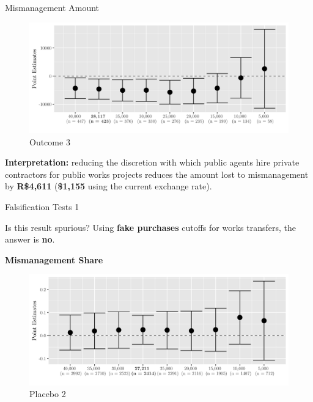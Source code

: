 \documentclass[10pt,ignorenonframetext,]{beamer}
\begin{document}
\begin{frame}{Mismanagement Amount}
\protect\hypertarget{mismanagement-amount}{}

\begin{figure}
\centering
\includegraphics{./images/mismanagementplot3.png}
\caption{Outcome 3}
\end{figure}

\textbf{Interpretation:} reducing the discretion with which public
agents hire private contractors for public works projects reduces the
amount lost to mismanagement by \textbf{R\$4,611} (\textbf{\$1,155}
using the current exchange rate).

\end{frame}

\begin{frame}{Falsification Tests 1}
\protect\hypertarget{falsification-tests-1-1}{}

Is this result spurious? Using \textbf{fake purchases} cutoffs for works
transfers, the answer is \textbf{no}.

\textbf{Mismanagement Share}

\begin{figure}
\centering
\includegraphics{./images/01falsificationplot2.png}
\caption{Placebo 2}
\end{figure}

\end{frame}
\end{document}
